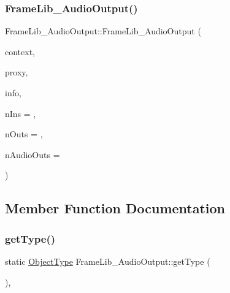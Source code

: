 \subsubsection{\texorpdfstring{Frame\+Lib\+\_\+\+Audio\+Output()}{FrameLib\_AudioOutput()}}
{\footnotesize\ttfamily Frame\+Lib\+\_\+\+Audio\+Output\+::\+Frame\+Lib\+\_\+\+Audio\+Output (\begin{DoxyParamCaption}\item[{\hyperlink{class_frame_lib___context}{Frame\+Lib\+\_\+\+Context}}]{context,  }\item[{\hyperlink{struct_frame_lib___proxy}{Frame\+Lib\+\_\+\+Proxy} $\ast$}]{proxy,  }\item[{\hyperlink{class_frame_lib___parameters_1_1_info}{Frame\+Lib\+\_\+\+Parameters\+::\+Info} $\ast$}]{info,  }\item[{unsigned long}]{n\+Ins = {},  }\item[{unsigned long}]{n\+Outs = {},  }\item[{unsigned long}]{n\+Audio\+Outs = {} }\end{DoxyParamCaption})\hspace{0.3cm}{\ttfamily [inline]}}



\subsection{Member Function Documentation}
\mbox{\label{class_frame_lib___audio_output_a99908793774ac5046c3e369bc9a19259}} 
\subsubsection{\texorpdfstring{get\+Type()}{getType()}}
{\footnotesize\ttfamily static \hyperlink{_frame_lib___types_8h_a842c5e2e69277690b064bf363c017980}{Object\+Type} Frame\+Lib\+\_\+\+Audio\+Output\+::get\+Type (\begin{DoxyParamCaption}{ }\end{DoxyParamCaption})\hspace{0.3cm}{\ttfamily [inline]}, {\ttfamily [static]}}

\mbox{\label{class_frame_lib___audio_output_a394659d38e6e48418faf75bbae4cbc01}} 
